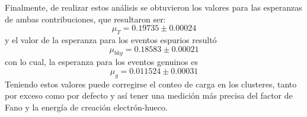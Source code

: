 \indent Finalmente, de realizar estos análisis se obtuvieron los valores para las esperanzas de ambas contribuciones, que resultaron ser:
\begin{equation*}
    \mu_{T} = 0.19735 \pm 0.00024
\end{equation*} 
y el valor de la esperanza para los eventos espurios resultó 
\begin{equation*}
    \mu_{bkg} = 0.18583 \pm 0.00021
\end{equation*}
con lo cual, la esperanza para los eventos genuinos es 
\begin{equation*}
    \mu_{g} = 0.011524 \pm 0.00031
\end{equation*}
Teniendo estos valores puede corregirse el conteo de carga en los clusteres, tanto por exceso como por defecto y así tener una medición más precisa del factor de Fano y la energía de creación electrón-hueco.

